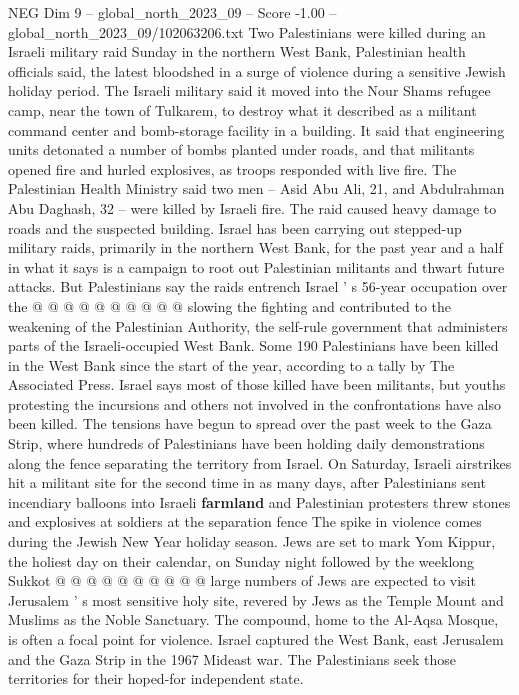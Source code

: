 \begin{textsample}{NEG Dim 9 – global\_north\_2023\_09 – Score -1.00 – global\_north\_2023\_09/102063206.txt}  \label{ex:f9_neg_039}
Two Palestinians were killed during an Israeli military raid Sunday in the northern West Bank, Palestinian health officials said, the latest bloodshed in a surge of violence during a sensitive Jewish holiday period.
The Israeli military said it moved into the Nour Shams refugee camp, near the town of Tulkarem, to destroy what it described as a militant command center and bomb-storage facility in a building.
It said that engineering units detonated a number of bombs planted under roads, and that militants opened fire and hurled explosives, as troops responded with live fire.
The Palestinian Health Ministry said two men -- Asid Abu Ali, 21, and Abdulrahman Abu Daghash, 32 -- were killed by Israeli fire.
The raid caused heavy damage to roads and the suspected building.
Israel has been carrying out stepped-up military raids, primarily in the northern West Bank, for the past year and a half in what it says is a campaign to root out Palestinian militants and thwart future attacks.
But Palestinians say the raids entrench Israel ' s 56-year occupation over the @ @ @ @ @ @ @ @ @ @ slowing the fighting and contributed to the weakening of the Palestinian Authority, the self-rule government that administers parts of the Israeli-occupied West Bank.
Some 190 Palestinians have been killed in the West Bank since the start of the year, according to a tally by The Associated Press.
Israel says most of those killed have been militants, but youths protesting the incursions and others not involved in the confrontations have also been killed.
The tensions have begun to spread over the past week to the Gaza Strip, where hundreds of Palestinians have been holding daily demonstrations along the fence separating the territory from Israel.
On Saturday, Israeli airstrikes hit a militant site for the second time in as many days, after Palestinians sent incendiary balloons into Israeli \textbf{farmland} and Palestinian protesters threw stones and explosives at soldiers at the separation fence The spike in violence comes during the Jewish New Year holiday season.
Jews are set to mark Yom Kippur, the holiest day on their calendar, on Sunday night followed by the weeklong Sukkot @ @ @ @ @ @ @ @ @ @ large numbers of Jews are expected to visit Jerusalem ' s most sensitive holy site, revered by Jews as the Temple Mount and Muslims as the Noble Sanctuary.
The compound, home to the Al-Aqsa Mosque, is often a focal point for violence.
Israel captured the West Bank, east Jerusalem and the Gaza Strip in the 1967 Mideast war.
The Palestinians seek those territories for their hoped-for independent state.

\end{textsample}
